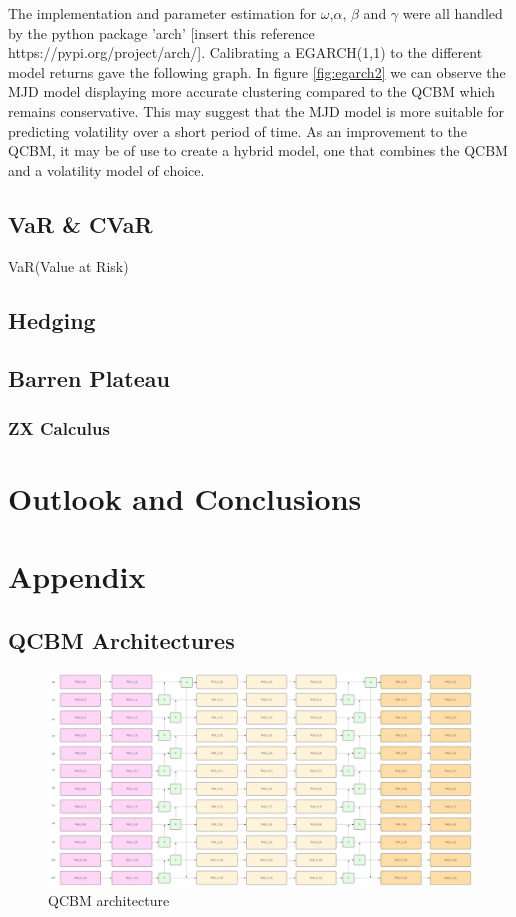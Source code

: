 \documentclass[12pt]{article}
\numberwithin{equation}{section}
\begin{document}
The implementation and parameter estimation for $\omega$,$\alpha$, $\beta$ and 
$\gamma$ were all handled by 
the python package 'arch' [insert this reference https://pypi.org/project/arch/]. 
Calibrating a EGARCH(1,1) to the different model returns gave the following graph. 
In figure \ref{fig:egarch2} we can observe the MJD model displaying more accurate 
clustering compared to the QCBM which remains conservative. This may suggest that 
the MJD model is more suitable for predicting volatility over a short period of 
time. As an improvement to the QCBM, it may be of use to create a hybrid model, 
one that combines the QCBM and a volatility model of choice. 

\newpage
\subsection{VaR \& CVaR}
VaR(Value at Risk) 
\subsection{Hedging}

\subsection{Barren Plateau}

\subsubsection{ZX Calculus}

\clearpage 

\section{Outlook and Conclusions}


\clearpage
\section{Appendix}
\subsection{QCBM Architectures}

\begin{figure}[h]
    \centering
    \includegraphics[scale=0.3, angle=270, width=\textwidth-209]{qcbm1.png}
    \caption{QCBM architecture}
\end{figure}
\clearpage


\printbibliography
\end{document}
